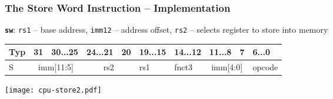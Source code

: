 \documentclass{beamer}
\begin{document}
\begin{frame}[shrink=18]
\frametitle{The Store Word Instruction -- Implementation}

\textbf{\texttt{sw}}: \texttt{rs1} -- base address, \texttt{imm12} -- address offset, \texttt{rs2} -- selects register to store into memory

\bigskip

\begin{table}
\footnotesize
\begin{tabular}{|m{0.4cm}|m{0.4cm}|m{1.0cm}|m{1.0cm}|m{0.4cm}|m{1.0cm}|m{1.0cm}|m{1.0cm}|m{0.4cm}|m{1.0cm}|}\hline
Typ & 31 & 30...25 & 24...21 & 20 & 19...15 & 14...12 & 11...8 & 7 & 6...0 \\ \hline
S & \multicolumn{2}{c|}{ imm[11:5] } & \multicolumn{2}{c|}{ rs2 } & rs1 & fnct3 &\multicolumn{2}{c|}{ imm[4:0] } & opcode\\ \hline
\end{tabular}
\end{table}

\bigskip

\texttt{[image: cpu-store2.pdf]}

\end{frame}
\end{document}
